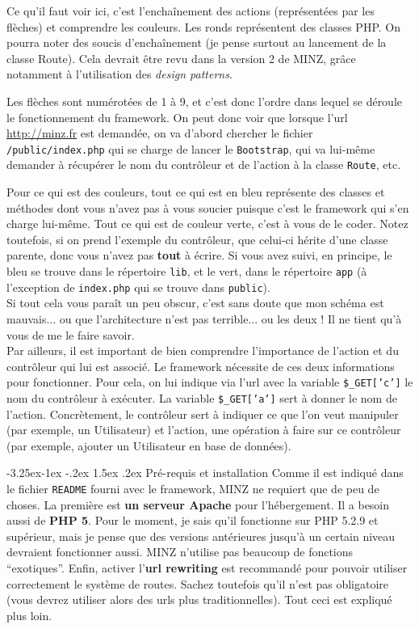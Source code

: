 \documentclass[a4paper,11pt]{article}
\makeatletter
\renewcommand{\subsection}{\@startsection{subsection}{2}{\z@}%
             {-3.25ex\@plus -1ex \@minus -.2ex}%
             {1.5ex \@plus .2ex}%
             {\color{bleuFonce}\normalfont\large\bfseries}}
\makeatother
\begin{document}
Ce qu'il faut voir ici, c'est l'enchaînement des actions (représentées par les flèches) et comprendre les couleurs. Les ronds représentent des classes PHP. On pourra noter des soucis d'enchaînement (je pense surtout au lancement de la classe Route). Cela devrait être revu dans la version 2 de MINZ, grâce notamment à l'utilisation des \textit{design patterns}.

Les flèches sont numérotées de 1 à 9, et c'est donc l'ordre dans lequel se déroule le fonctionnement du framework. On peut donc voir que lorsque l'url \url{http://minz.fr} est demandée, on va d'abord chercher le fichier \texttt{/public/index.php} qui se charge de lancer le \texttt{Bootstrap}, qui va lui-même demander à récupérer le nom du contrôleur et de l'action à la classe \texttt{Route}, etc.

Pour ce qui est des couleurs, tout ce qui est en bleu représente des classes et méthodes dont vous n'avez pas à vous soucier puisque c'est le framework qui s'en charge lui-même. Tout ce qui est de couleur verte, c'est à vous de le coder. Notez toutefois, si on prend l'exemple du contrôleur, que celui-ci hérite d'une classe parente, donc vous n'avez pas \textbf{tout} à écrire. Si vous avez suivi, en principe, le bleu se trouve dans le répertoire \texttt{lib}, et le vert, dans le répertoire \texttt{app} (à l'exception de \texttt{index.php} qui se trouve dans \texttt{public}).\\

Si tout cela vous paraît un peu obscur, c'est sans doute que mon schéma est mauvais... ou que l'architecture n'est pas terrible... ou les deux ! Il ne tient qu'à vous de me le faire savoir.\\

Par ailleurs, il est important de bien comprendre l'importance de l'action et du contrôleur qui lui est associé. Le framework nécessite de ces deux informations pour fonctionner. Pour cela, on lui indique via l'url avec la variable \texttt{\$\_GET['c']} le nom du contrôleur à exécuter. La variable \texttt{\$\_GET['a']} sert à donner le nom de l'action. Concrètement, le contrôleur sert à indiquer ce que l'on veut manipuler (par exemple, un Utilisateur) et l'action, une opération à faire sur ce contrôleur (par exemple, ajouter un Utilisateur en base de données).

\subsection{Pré-requis et installation}
Comme il est indiqué dans le fichier \texttt{README} fourni avec le framework, MINZ ne requiert que de peu de choses. La première est \textbf{un serveur Apache} pour l'hébergement. Il a besoin aussi de \textbf{PHP 5}. Pour le moment, je sais qu'il fonctionne sur PHP 5.2.9 et supérieur, mais je pense que des versions antérieures jusqu'à un certain niveau devraient fonctionner aussi. MINZ n'utilise pas beaucoup de fonctions ``exotiques''. Enfin, activer l'\textbf{url rewriting} est recommandé pour pouvoir utiliser correctement le système de routes. Sachez toutefois qu'il n'est pas obligatoire (vous devrez utiliser alors des urls plus traditionnelles). Tout ceci est expliqué plus loin.
\end{document}
